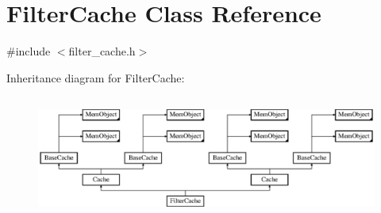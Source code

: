 \hypertarget{classFilterCache}{\section{Filter\-Cache Class Reference}
\label{classFilterCache}
}


{\ttfamily \#include $<$filter\-\_\-cache.\-h$>$}

Inheritance diagram for Filter\-Cache\-:\begin{figure}[H]
\begin{center}
\leavevmode
\includegraphics[height=4.069767cm]{classFilterCache}
\end{center}
\end{figure}
